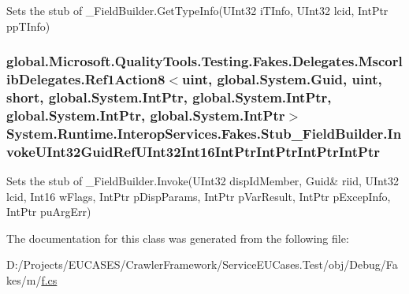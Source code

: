 Sets the stub of \-\_\-\-Field\-Builder.\-Get\-Type\-Info(\-U\-Int32 i\-T\-Info, U\-Int32 lcid, Int\-Ptr pp\-T\-Info)

\hypertarget{class_system_1_1_runtime_1_1_interop_services_1_1_fakes_1_1_stub___field_builder_a82c7a5f59beba37a0ecf5a24dc5eccb7}{
\subsubsection[{Invoke\-U\-Int32\-Guid\-Ref\-U\-Int32\-Int16\-Int\-Ptr\-Int\-Ptr\-Int\-Ptr\-Int\-Ptr}]{\setlength{\rightskip}{0pt plus 5cm}global.\-Microsoft.\-Quality\-Tools.\-Testing.\-Fakes.\-Delegates.\-Mscorlib\-Delegates.\-Ref1\-Action8$<$uint, global.\-System.\-Guid, uint, short, global.\-System.\-Int\-Ptr, global.\-System.\-Int\-Ptr, global.\-System.\-Int\-Ptr, global.\-System.\-Int\-Ptr$>$ System.\-Runtime.\-Interop\-Services.\-Fakes.\-Stub\-\_\-\-Field\-Builder.\-Invoke\-U\-Int32\-Guid\-Ref\-U\-Int32\-Int16\-Int\-Ptr\-Int\-Ptr\-Int\-Ptr\-Int\-Ptr}}\label{class_system_1_1_runtime_1_1_interop_services_1_1_fakes_1_1_stub___field_builder_a82c7a5f59beba37a0ecf5a24dc5eccb7}


Sets the stub of \-\_\-\-Field\-Builder.\-Invoke(U\-Int32 disp\-Id\-Member, Guid\& riid, U\-Int32 lcid, Int16 w\-Flags, Int\-Ptr p\-Disp\-Params, Int\-Ptr p\-Var\-Result, Int\-Ptr p\-Excep\-Info, Int\-Ptr pu\-Arg\-Err)



The documentation for this class was generated from the following file\-:\begin{DoxyCompactItemize}
\item 
D\-:/\-Projects/\-E\-U\-C\-A\-S\-E\-S/\-Crawler\-Framework/\-Service\-E\-U\-Cases.\-Test/obj/\-Debug/\-Fakes/m/\hyperlink{m_2f_8cs}{f.\-cs}\end{DoxyCompactItemize}
